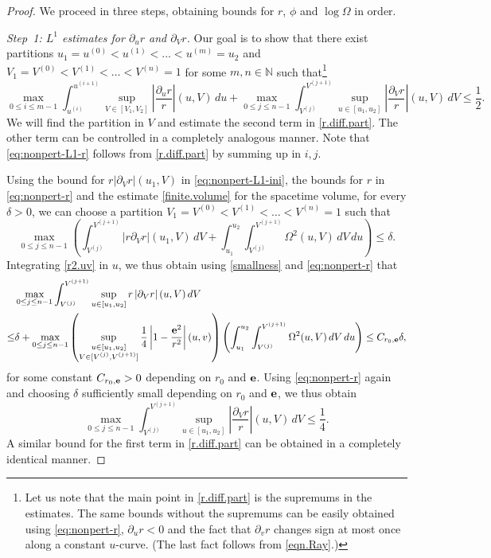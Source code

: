 \documentclass[10pt, reqno]{amsart}
\theoremstyle{definition}
\theoremstyle{remark}
\numberwithin{equation}{section}
\newcommand{\rd}{\partial}
\newcommand{\0}{\emptyset}
\newcommand{\Omg}{\Omega}
\newcommand{\bfe}{{\bf e}}
\newcommand{\f}{\frac}
\newcommand{\pfstep}[1]{\vspace{.5em} {\it \noindent #1.}}
\begin{document}
\begin{proof}
We proceed in three steps, obtaining bounds for $r$, $\phi$ and $\log \Omg$ in order.

\pfstep{Step~1: $L^1$ estimates for $\rd_u r$ and $\rd_{V}r$}
Our goal is to show that there exist partitions $u_1=u^{(0)}<u^{(1)}<...<u^{(m)}=u_2$ and $V_1= V^{(0)}< V^{(1)}<\dots< V^{(n)} = 1$ for some $m,n\in\mathbb N$ such that\footnote{Let us note that the main point in \eqref{r.diff.part} is the supremums in the estimates. The same bounds without the supremums can be easily obtained using \eqref{eq:nonpert-r}, $\rd_u r<0$ and the fact that $\rd_v r$ changes sign at most once along a constant $u$-curve. (The last fact follows from \eqref{eqn.Ray}.)}
\begin{equation}\label{r.diff.part}
\max_{0\leq i\leq m-1}\int_{u^{(i)}}^{u^{(i+1)}} \sup_{ V\in [ V_1, V_2]}\left|\f{\rd_u r}{r}\right|(u, V)\, du+\max_{0\leq j\leq n-1}\int_{V^{(j)}}^{V^{(j+1)}}\sup_{u\in [u_1,u_2]}\left|\f{\rd_{V} r}{r}\right|(u,V)\,d V\leq \f 12.
\end{equation}
We will find the partition in $V$ and estimate the second term in \eqref{r.diff.part}. The other term can be controlled in a completely analogous manner. Note that \eqref{eq:nonpert-L1-r} follows from \eqref{r.diff.part} by summing up in $i, j$.

Using the bound for $r |\rd_{V} r|(u_1, V)$ in \eqref{eq:nonpert-L1-ini}, the bounds for $r$ in \eqref{eq:nonpert-r} and the estimate \eqref{finite.volume} for the spacetime volume, for every $\delta>0$, we can choose a partition $V_1=V^{(0)}< V^{(1)}<\dots< V^{(n)}=1$ such that 
\begin{equation}\label{smallness}
\max_{0\leq j\leq n-1}\left(\int_{V^{(j)}}^{V^{(j+1)}}\left|r\rd_{V} r\right|(u_1, V)\,d V+\int_{u_1}^{u_2}\int_{V^{(j)}}^{V^{(j+1)}} \Omg^2(u,V)\, d V\, du\right)\leq \delta.
\end{equation}
Integrating \eqref{r2.uv} in $u$, we thus obtain using \eqref{smallness} and \eqref{eq:nonpert-r} that
\begin{equation}
\begin{split}
&\max_{0\leq j\leq n-1}\int_{V^{(j)}}^{V^{(j+1)}}\sup_{u \in [u_1,u_2]} r \left|\rd_{V} r \right|(u, V)\,d V\\
\leq &\delta +\max_{0\leq j\leq n-1}\left(\sup_{\substack{u \in [u_1,u_2] \\ V \in [ V^{(j)}, V^{(j+1)}]}} \f 1{4 }\left|1-\f{{\bf e}^2}{r^2}\right|(u, v)\right)\left(\int_{u_1}^{u_2}\int_{V^{(j)}}^{V^{(j+1)}} \Omg^2(u, V)\, d V\, d u\right)\leq C_{r_0,\bfe} \delta,
\end{split}
\end{equation}
for some constant $C_{r_0,\bfe}>0$ depending on $r_0$ and ${\bf e}$. Using \eqref{eq:nonpert-r} again and choosing $\delta$ sufficiently small depending on $r_0$ and ${\bf e}$, we thus obtain
$$\max_{0\leq j\leq n-1}\int_{V^{(j)}}^{V^{(j+1)}}\sup_{u\in [u_1,u_2]}\left|\f{\rd_{V} r}{r}\right|(u, V)\,d V\leq \f 14.$$
A similar bound for the first term in \eqref{r.diff.part} can be obtained in a completely identical manner. 


\end{proof}
\end{document}
